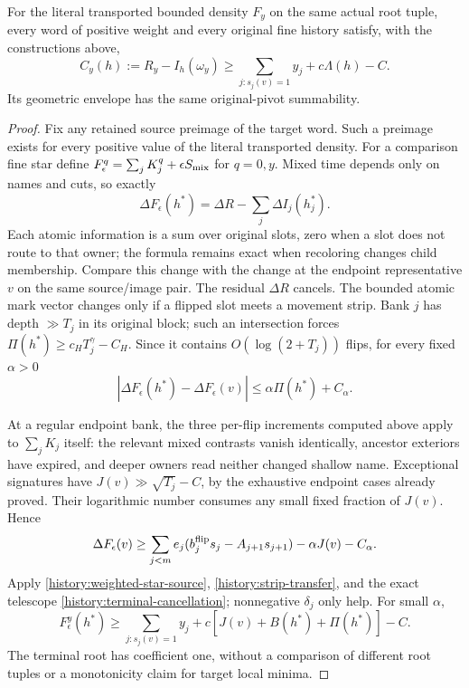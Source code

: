 \begin{proposition}
\label{history:target}
For the literal transported bounded density $F_y$ on the same actual
root tuple, every word of positive weight and every original fine
history satisfy, with the constructions above,
\begin{equation}
 C_y(h):=R_y-I_h(\omega_y)
       \ge\sum_{j:s_j(v)=1}y_j+c\Lambda(h)-C.
 \label{history:target-geometry}
\end{equation}
Its geometric envelope has the same original-pivot summability.
\end{proposition}
\begin{proof}
Fix any retained source preimage of the target word. Such a preimage
exists for every positive value of the literal transported density.
For a comparison fine star define
$F_\epsilon^q=\sum_jK_j^q+\epsilon S_{\rm mix}$ for $q=0,y$.
Mixed time depends only on names and cuts, so exactly
\[
 \Delta F_\epsilon(h^*)=\Delta R-\sum_j\Delta I_j(h_j^*).
\]
Each atomic information is a sum over original slots, zero when a
slot does not route to that owner; the formula remains exact when
recoloring changes child membership. Compare this change with the
change at the endpoint representative $v$ on the same source/image
pair. The residual $\Delta R$ cancels. The bounded atomic mark
vector changes only if a flipped slot meets a movement strip.
Bank $j$ has depth $\gg T_j$ in its original block; such an
intersection forces $\Pi(h^*)\ge c_HT_j^\gamma-C_H$.
Since it contains $O(\log(2+T_j))$ flips, for every fixed $\alpha>0$
\begin{equation}
 |\Delta F_\epsilon(h^*)-\Delta F_\epsilon(v)|
                      \le\alpha\Pi(h^*)+C_\alpha.
 \label{history:strip-transfer}
\end{equation}

At a regular endpoint bank, the three per-flip increments computed
above apply to $\sum_jK_j$ itself: the relevant mixed contrasts vanish
identically, ancestor exteriors have expired, and deeper owners read
neither changed shallow name. Exceptional signatures have
$J(v)\gg\sqrt{T_j}-C$, by the exhaustive endpoint cases already
proved. Their logarithmic number consumes any small fixed fraction
of $J(v)$. Hence
\[
 \Delta F_\epsilon(v)\ge
 \sum_{j<m}e_j(b_j^{\rm flip}s_j-A_{j+1}s_{j+1})
                                  -\alpha J(v)-C_\alpha.
\]
Apply \eqref{history:weighted-star-source},
\eqref{history:strip-transfer}, and the exact telescope
\eqref{history:terminal-cancellation}; nonnegative $\delta_j$ only
help. For small $\alpha$,
\begin{equation}
 F_\epsilon^y(h^*)\ge\sum_{j:s_j(v)=1}y_j+
                          c[J(v)+B(h^*)+\Pi(h^*)]-C.
 \label{history:weighted-star-target}
\end{equation}
The terminal root has coefficient one, without a comparison of different
root tuples or a monotonicity claim for target local minima.


\end{proof}

